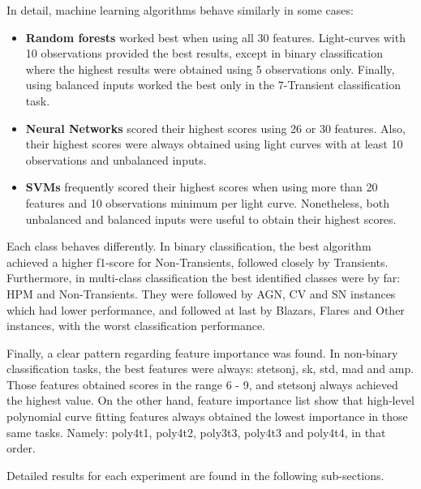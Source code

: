 \documentclass[a4paper,fleqn,usenatbib]{mnras}
\begin{document}
In detail, machine learning algorithms behave similarly in some
cases: 

\begin{itemize}
    \item \textbf{Random forests} worked best when using all 30
      features. Light-curves with 10 observations provided the best
      results, except in binary classification where the highest
      results were obtained using 5 observations only. Finally, using
      balanced inputs worked the best only in the 7-Transient
      classification task.  
    \item \textbf{Neural Networks} scored their highest scores using
      26 or 30 features. Also, their highest scores were always
      obtained using light curves with at least 10 observations and
      unbalanced inputs. 
    \item \textbf{SVMs} frequently scored their highest scores when
      using more than 20 features and 10 observations minimum per
      light curve. Nonetheless, both unbalanced and balanced inputs
      were useful to obtain their highest scores. 
\end{itemize}

Each class behaves differently. 
In binary classification,
the best algorithm achieved a higher f1-score for Non-Transients,
followed closely by Transients. Furthermore, in multi-class
classification the best identified classes were by far: HPM and
Non-Transients. They were followed by AGN, CV and SN instances which
had lower performance, and followed at last by Blazars, Flares and
Other instances, with the worst classification performance.  


Finally, a clear pattern regarding feature importance was found. In non-binary classification tasks, the best features were always: stetson\textunderscore j, sk, std, mad and amp. Those features obtained scores in the range 6 - 9, and stetson\textunderscore j always achieved the highest value. On the other hand, feature importance list show that high-level polynomial curve fitting features always obtained the lowest importance in those same tasks. Namely: poly4\textunderscore t1, poly4\textunderscore t2, poly3\textunderscore t3, poly4\textunderscore t3 and poly4\textunderscore t4, in that order.

Detailed results for each experiment are found in the following sub-sections.
\end{document}
